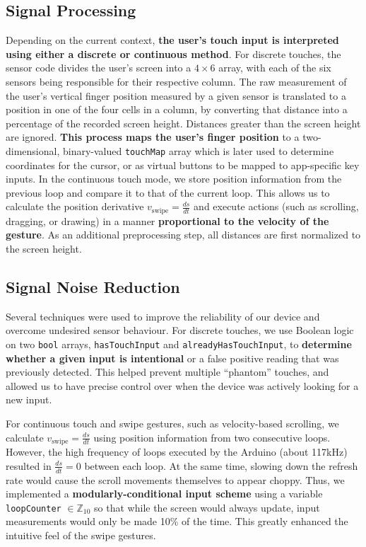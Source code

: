 \documentclass{article}
\begin{document}
\subsection{Signal Processing}
Depending on the current context, \textbf{the user’s touch input is interpreted using either a discrete or continuous method}. For discrete touches, the sensor code divides the user’s screen into a $4\times6$ array, with each of the six sensors being responsible for their respective column. The raw measurement of the user’s vertical finger position measured by a given sensor is translated to a position in one of the four cells in a column, by converting that distance into a percentage of the recorded screen height. Distances greater than the screen height are ignored. \textbf{This process maps the user’s finger position} to a two-dimensional, binary-valued \verb-touchMap- array which is later used to determine coordinates for the cursor, or as virtual buttons to be mapped to app-specific key inputs. In the continuous touch mode, we store position information from the previous loop and compare it to that of the current loop. This allows us to calculate the position derivative $v_{\text{swipe}}=\frac{ds}{dt}$ and execute actions (such as scrolling, dragging, or drawing) in a manner \textbf{proportional to the velocity of the gesture}. As an additional preprocessing step, all distances are first normalized to the screen height.

\subsection{Signal Noise Reduction}
Several techniques were used to improve the reliability of our device and overcome undesired sensor behaviour. For discrete touches, we use Boolean logic on two \verb-bool- arrays, \verb-hasTouchInput- and \verb-alreadyHasTouchInput-, to \textbf{determine whether a given input is intentional} or a false positive reading that was previously detected. This helped prevent multiple “phantom” touches, and allowed us to have precise control over when the device was actively looking for a new input.

For continuous touch and swipe gestures, such as velocity-based scrolling, we calculate $v_{\text{swipe}}=\frac{ds}{dt}$ using position information from two consecutive loops. However, the high frequency of loops executed by the Arduino (about 117kHz) resulted in $\frac{ds}{dt}=0$ between each loop. At the same time, slowing down the refresh rate would cause the scroll movements themselves to appear choppy. Thus, we implemented a \textbf{modularly-conditional input scheme} using a variable \verb-loopCounter- $\in\mathbb{Z}_{10}$ so that while the screen would always update, input measurements would only be made 10\% of the time. This greatly enhanced the intuitive feel of the swipe gestures.
\end{document}
